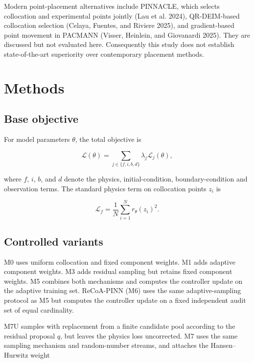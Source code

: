 \documentclass[
  11pt,
]{article}
\begin{document}
Modern point-placement alternatives include PINNACLE, which selects
collocation and experimental points jointly (Lau et al. 2024),
QR-DEIM-based collocation selection (Celaya, Fuentes, and Riviere 2025),
and gradient-based point movement in PACMANN (Visser, Heinlein, and
Giovanardi 2025). They are discussed but not evaluated here.
Consequently this study does not establish state-of-the-art superiority
over contemporary placement methods.

\hypertarget{methods}{%
\section{Methods}\label{methods}}

\hypertarget{base-objective}{%
\subsection{Base objective}\label{base-objective}}

For model parameters \(\theta\), the total objective is

\begin{equation}
\mathcal L(\theta)=
\sum_{j\in\{f,i,b,d\}}\lambda_j\mathcal L_j(\theta),
\end{equation}

where \(f\), \(i\), \(b\), and \(d\) denote the physics,
initial-condition, boundary-condition and observation terms. The
standard physics term on collocation points \(z_i\) is

\begin{equation}
\mathcal L_f=\frac1N\sum_{i=1}^{N}r_\theta(z_i)^2.
\end{equation}

\hypertarget{controlled-variants}{%
\subsection{Controlled variants}\label{controlled-variants}}

M0 uses uniform collocation and fixed component weights. M1 adds
adaptive component weights. M3 adds residual sampling but retains fixed
component weights. M5 combines both mechanisms and computes the
controller update on the adaptive training set. ReCoA-PINN (M6) uses the
same adaptive-sampling protocol as M5 but computes the controller update
on a fixed independent audit set of equal cardinality.

M7U samples with replacement from a finite candidate pool according to
the residual proposal \(q\), but leaves the physics loss uncorrected. M7
uses the same sampling mechanism and random-number streams, and attaches
the Hansen--Hurwitz weight
\end{document}

